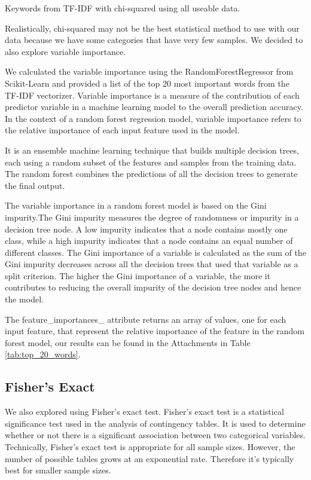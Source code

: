 \begin{table}[!ht]
\centering
\caption{Keywords from TF-IDF with chi-squared using all useable data.}

\label{tab:correlated_unigrams_all}
\end{table}

Realistically, chi-squared may not be the best statistical method to use with our data because we have some categories that have very few samples. We decided to also explore variable importance.

We calculated the variable importance using the RandomForestRegressor from Scikit-Learn and provided a list of the top 20 most important words from the TF-IDF vectorizer. Variable importance is a measure of the contribution of each predictor variable in a machine learning model to the overall prediction accuracy. In the context of a random forest regression model, variable importance refers to the relative importance of each input feature used in the model.

It is an ensemble machine learning technique that builds multiple decision trees, each using a random subset of the features and samples from the training data. The random forest combines the predictions of all the decision trees to generate the final output. 

The variable importance in a random forest model is based on the Gini impurity.The Gini impurity measures the degree of randomness or impurity in a decision tree node. A low impurity indicates that a node contains mostly one class, while a high impurity indicates that a node contains an equal number of different classes. The Gini importance of a variable is calculated as the sum of the Gini impurity decreases across all the decision trees that used that variable as a split criterion. The higher the Gini importance of a variable, the more it contributes to reducing the overall impurity of the decision tree nodes and hence the model. 

The feature\_importances\_ attribute returns an array of values, one for each input feature, that represent the relative importance of the feature in the random forest model, our results can be found in the Attachments in Table \ref{tab:top_20_words}.

\subsection{Fisher's Exact}

We also explored using Fisher's exact test. Fisher's exact test is a statistical significance test used in the analysis of contingency tables. It is used to determine whether or not there is a significant association between two categorical variables. Technically, Fisher's exact test is appropriate for all sample sizes. However, the number of possible tables grows at an exponential rate. Therefore it's typically best for smaller sample sizes.

